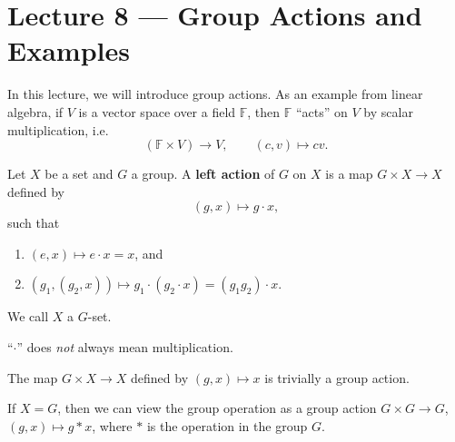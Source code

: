 \section{Lecture 8 — Group Actions and Examples}

In this lecture, we will introduce group actions. As an example from linear algebra, if $V$ is a vector space over a field $\mathbb F$, then $\mathbb F$ ``acts'' on $V$ by scalar multiplication, i.e.
$$(\mathbb F\times V)\to V,\qquad (c,v)\mapsto cv.$$

\begin{definition}
	Let $X$ be a set and $G$ a group. A \textbf{left action} of $G$ on $X$ is a map $G\times X\to X$ defined by
	$$(g,x)\mapsto g\cdot x,$$
	such that
	\begin{enumerate}
		\item $(e,x)\mapsto e\cdot x=x$, and
		\item $(g_1,(g_2,x))\mapsto g_1\cdot(g_2\cdot x)=(g_1g_2)\cdot x$.
	\end{enumerate}
	We call $X$ a $G$-set.
\end{definition}

\begin{remark}
	``$\cdot$'' does \textit{not} always mean multiplication.
\end{remark}

\begin{example}
	The map $G\times X\to X$ defined by $(g,x)\mapsto x$ is trivially a group action.
\end{example}

\begin{example}
	If $X=G$, then we can view the group operation as a group action $G\times G\to G$, $(g,x)\mapsto g*x$, where $*$ is the operation in the group $G$.
\end{example}

